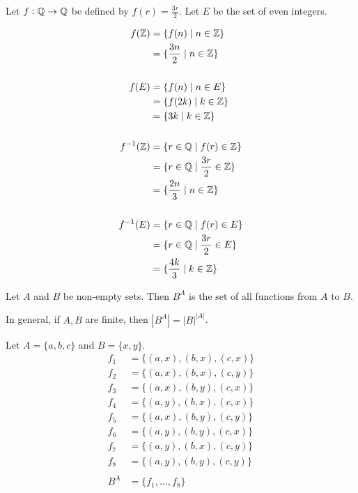 \documentclass{article}
\begin{document}
    \begin{example}
      Let $f: \mathbb{Q} \to \mathbb{Q}$ be defined by $f(r) = \frac{3r}{2}$. Let $E$ be the set of even integers.

      \begin{align*}
        f(\mathbb{Z}) &= \{f(n) \mid n \in \mathbb{Z}\}\\
        &= \{\frac{3n}{2} \mid n \in \mathbb{Z}\}\\
        \\
        f(E) &= \{f(n) \mid n \in E\}\\
        &= \{f(2k) \mid k \in \mathbb{Z}\}\\
        &= \{3k \mid k \in \mathbb{Z}\}\\
        \\
        f^{-1}(\mathbb{Z}) &= \{r \in \mathbb{Q} \mid f(r) \in \mathbb{Z}\}\\
        &= \{r \in \mathbb{Q} \mid \frac{3r}{2} \in \mathbb{Z}\}\\
        &= \{\frac{2n}{3} \mid n \in \mathbb{Z}\}\\
        \\
        f^{-1}(E) &= \{r \in \mathbb{Q} \mid f(r) \in E\}\\
        &= \{ r\in \mathbb{Q} \mid \frac{3r}{2} \in E\}\\
        &= \{\frac{4k}{3} \mid k \in \mathbb{Z}\}\\
      \end{align*}
    \end{example}
    \begin{definition}
      Let $A$ and $B$ be non-empty sets. Then $B^A$ is the set of all functions from $A$ to $B$.

      In general, if $A, B$ are finite, then $|B^A| = |B|^{|A|}$.
    \end{definition}
    \begin{example}
      Let $A = \{a, b, c\}$ and $B = \{x, y\}$.
      \begin{align*}
        f_1 &= \{(a, x), (b, x), (c, x)\}\\
        f_2 &= \{(a, x), (b, x), (c, y)\}\\
        f_3 &= \{(a, x), (b, y), (c, x)\}\\
        f_4 &= \{(a, y), (b, x), (c, x)\}\\
        f_5 &= \{(a, x), (b, y), (c, y)\}\\
        f_6 &= \{(a, y), (b, y), (c, x)\}\\
        f_7 &= \{(a, y), (b, x), (c, y)\}\\
        f_8 &= \{(a, y), (b, y), (c, y)\}\\
        \\
        B^A &= \{f_1, \dots, f_8\}\\
      \end{align*}
    \end{example}
\end{document}
